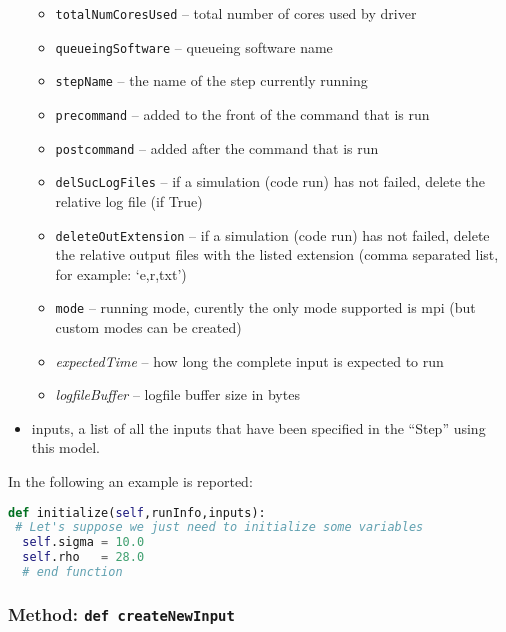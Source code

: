 \begin{itemize}
\begin{itemize}
    \item \texttt{totalNumCoresUsed} -- total number of cores used by driver
    \item \texttt{queueingSoftware} -- queueing software name
    \item \texttt{stepName} -- the name of the step currently running
    \item \texttt{precommand} -- added to the front of the command that is run
    \item \texttt{postcommand} -- added after the command that is run
    \item \texttt{delSucLogFiles} -- if a simulation (code run) has not failed,
    delete the relative log file (if True)
    \item \texttt{deleteOutExtension} -- if a simulation (code run) has not
    failed, delete the relative output files with the listed extension (comma
    separated list, for example: `e,r,txt')
    \item \texttt{mode} -- running mode, curently the only mode supported is
      mpi (but custom modes can be created)
    \item \textit{expectedTime} -- how long the complete input is expected to
    run
    \item \textit{logfileBuffer} -- logfile buffer size in bytes
  \end{itemize}
  \item inputs, a list of all the inputs that have been specified in the
  ``Step'' using this model.
\end{itemize}
In the following an example is reported:
\begin{lstlisting}[language=python]
def initialize(self,runInfo,inputs):
 # Let's suppose we just need to initialize some variables
  self.sigma = 10.0
  self.rho   = 28.0
  # end function
\end{lstlisting}


\subsubsection{Method: \texttt{def createNewInput}}
\label{subsubsec:externalcreateNewInput}

